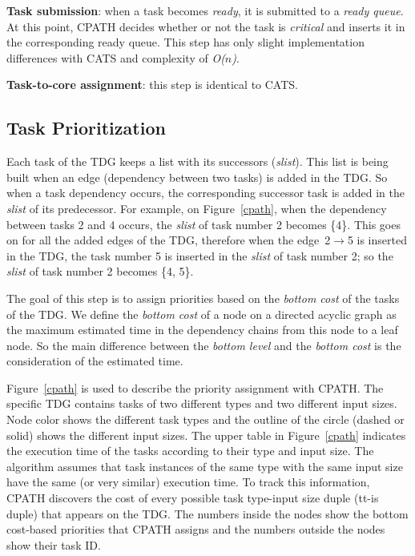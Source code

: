 \textbf{Task submission}: when a task becomes \textit{ready}, it is submitted to a \textit{ready queue}. At this point, CPATH decides whether or not the task is \textit{critical} and inserts it in the corresponding ready queue. This step has only slight implementation differences with CATS and complexity of \textit{O($n$)}.

\textbf{Task-to-core assignment}: this step is identical to CATS.


\subsection{Task Prioritization}

Each task of the TDG keeps a list with its successors (\textit{slist}).
This list is being built when an edge (dependency between two tasks) is added in the TDG.
So when a task dependency occurs, the corresponding successor task is added in the \textit{slist} of its predecessor.
For example, on Figure~\ref{cpath}, when the dependency between tasks 2 and 4 occurs, the \textit{slist} of task number 2 becomes \{4\}. 
This goes on for all the added edges of the TDG, therefore when the edge~2$\rightarrow$5 is inserted in the TDG, the task number 5 is inserted in the \textit{slist} of task number 2; so the \textit{slist} of task number 2 becomes \{4, 5\}.

The goal of this step is to assign priorities based on the \textit{bottom cost} of the tasks of the TDG.
We define the \textit{bottom cost} of a node on a directed acyclic graph as the maximum estimated time in the dependency chains from this node to a leaf node.
So the main difference between the \textit{bottom level} and the \textit{bottom cost} is the consideration of the estimated time.

Figure~\ref{cpath} is used to describe the priority assignment with CPATH.
The specific TDG contains tasks of two different types and two different input sizes.
Node color shows the different task types and the outline of the circle (dashed or solid) shows the different input sizes.
The upper table in Figure~\ref{cpath} indicates the execution time of the tasks according to their type and input size.
The algorithm assumes that task instances of the same type with the same input size have the same (or very similar) execution time.
To track this information, CPATH discovers the cost of every possible task type-input size duple (tt-is duple) that appears on the TDG.
The numbers inside the nodes show the bottom cost-based priorities that CPATH assigns and the numbers outside the nodes show their task ID.


